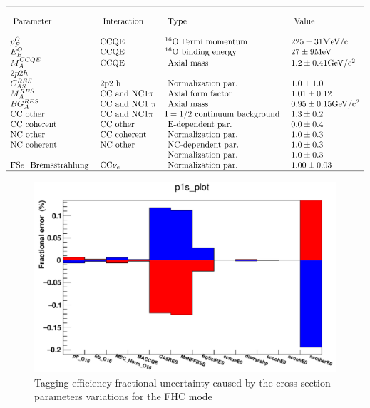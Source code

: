 \documentclass{article}
\begin{document}
$$
\begin{array}{llll}
\hline & & & \\
\text { Parameter } & \text { Interaction } & \text { Type } & \text { Value } \\
& & & \\
p_{F}^{O} & \mathrm{CCQE} & { }^{16} \mathrm{O} \text { Fermi momentum } & 225 \pm 31 \mathrm{MeV} / \mathrm{c} \\
E_{B}^{O} & \mathrm{CCQE} & { }^{16} \mathrm{O} \text { binding energy } & 27 \pm 9 \mathrm{MeV} \\
M_{A}^{C C Q E} & \mathrm{CCQE} & \text { Axial mass } & 1.2 \pm 0.41 \mathrm{GeV} / \mathrm{c}^{2} \\
2 p 2 h & & & \\
C_{A S}^{R E S} & 2 \mathrm{p} 2 \mathrm{~h} & \text { Normalization par. } & 1.0 \pm 1.0 \\
M_{A}^{R E S} & \mathrm{CC} \text { and } \mathrm{NC} 1 \pi & \text { Axial form factor } & 1.01 \pm 0.12 \\
B G_{A}^{R E S} & \mathrm{CC} \text { and NC1 } \pi & \text { Axial mass } & 0.95 \pm 0.15 \mathrm{GeV} / \mathrm{c}^{2} \\
\mathrm{CC} \text { other } & \mathrm{CC} \text { and } \mathrm{NC} 1 \pi & \mathrm{I}=1 / 2 \text { continuum background } & 1.3 \pm 0.2 \\
\mathrm{CC} \text { coherent } & \mathrm{CC} \text { other } & \text { E-dependent par. } & 0.0 \pm 0.4 \\
\mathrm{NC} \text { other } & \mathrm{CC} \text { coherent } & \text { Normalization par. } & 1.0 \pm 0.3 \\
\mathrm{NC} \text { coherent } & \mathrm{NC} \text { other } & \text { NC-dependent par. } & 1.0 \pm 0.3 \\
& & \text { Normalization par. } & 1.0 \pm 0.3 \\
\mathrm{FS} e^{-} \text {Bremsstrahlung } & \mathrm{CC} \nu_{e} & \text { Normalization par. } & 1.00 \pm 0.03 \\
\hline
\end{array}
\label{xsectable}
$$

\begin{figure}[h!]
    \includegraphics[scale=0.4]{xsec_uncertainty.png}
\caption{Tagging efficiency fractional uncertainty caused by the cross-section parameters variations for the FHC mode}
\label{fig:xsecuncertainty}
\end{figure}

\end{document}
